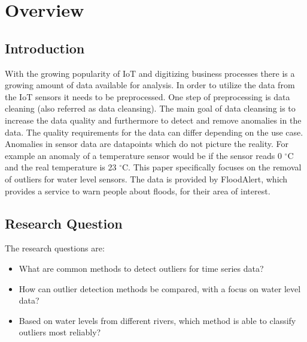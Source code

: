 \chapter{Overview}
\section{Introduction}\label{section:introduction}
With the growing popularity of \ac{IoT} and digitizing business processes there is a growing amount of data available for analysis.
In order to utilize the data from the \ac{IoT} sensors it needs to be preprocessed. One step of preprocessing is data cleaning (also referred as data cleansing).
The main goal of data cleansing is to increase the data quality and furthermore to detect and remove anomalies in the data. The quality requirements for the data can differ depending on the use case. Anomalies in sensor data are datapoints which do not picture the reality. For example an anomaly of a temperature sensor would be if the sensor reads 0 $^{\circ}$C and the real temperature is 23 $^{\circ}$C. This paper specifically focuses on the removal of outliers for water level sensors. The data is provided by FloodAlert\cite{strassmayrFloodAlertWaterLevels}, which provides a service to warn people about floods, for their area of interest.

\section{Research Question}
The research questions are:
\begin{itemize}
    \item What are common methods to detect outliers for time series data?
    \item How can outlier detection methods be compared, with a focus on water level data?
    \item Based on water levels from different rivers, which method is able to classify outliers most reliably?
\end{itemize}


